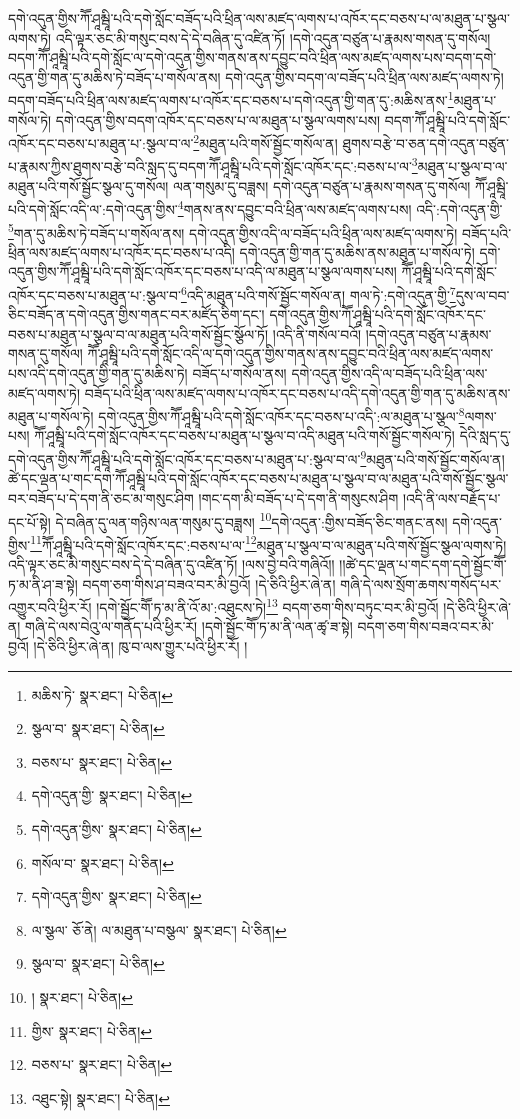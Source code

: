 དགེ་འདུན་གྱིས་ཀཽ་ཤཱམྦཱི་པའི་དགེ་སློང་བཟོད་པའི་ཕྲིན་ལས་མཛད་ལགས་པ་འཁོར་དང་བཅས་པ་ལ་མཐུན་པ་སྩལ་ལགས་ཏེ། འདི་ལྟར་ཅང་མི་གསུང་བས་དེ་དེ་བཞིན་དུ་འཛིན་ཏོ། །དགེ་འདུན་བཙུན་པ་རྣམས་གསན་དུ་གསོལ། བདག་ཀཽ་ཤཱམྦཱི་པའི་དགེ་སློང་ལ་དགེ་འདུན་གྱིས་གནས་ནས་དབྱུང་བའི་ཕྲིན་ལས་མཛད་ལགས་པས་བདག་དགེ་འདུན་གྱི་གན་དུ་མཆིས་ཏེ་བཟོད་པ་གསོལ་ནས། དགེ་འདུན་གྱིས་བདག་ལ་བཟོད་པའི་ཕྲིན་ལས་མཛད་ལགས་ཏེ། བདག་བཟོད་པའི་ཕྲིན་ལས་མཛད་ལགས་པ་འཁོར་དང་བཅས་པ་དགེ་འདུན་གྱི་གན་དུ་:མཆིས་ནས་\footnote{མཆིས་ཏེ་  སྣར་ཐང་།  པེ་ཅིན། }མཐུན་པ་གསོལ་ཏེ། དགེ་འདུན་གྱིས་བདག་འཁོར་དང་བཅས་པ་ལ་མཐུན་པ་སྩལ་ལགས་པས། བདག་ཀཽ་ཤཱམྦཱི་པའི་དགེ་སློང་འཁོར་དང་བཅས་པ་མཐུན་པ་:སྩལ་བ་ལ་\footnote{སྩལ་བ་  སྣར་ཐང་།  པེ་ཅིན། }མཐུན་པའི་གསོ་སྦྱོང་གསོལ་ན། ཐུགས་བརྩེ་བ་ཅན་དགེ་འདུན་བཙུན་པ་རྣམས་ཀྱིས་ཐུགས་བརྩེ་བའི་སླད་དུ་བདག་ཀཽ་ཤཱམྦཱི་པའི་དགེ་སློང་འཁོར་དང་:བཅས་པ་ལ་\footnote{བཅས་པ་  སྣར་ཐང་།  པེ་ཅིན། }མཐུན་པ་སྩལ་བ་ལ་མཐུན་པའི་གསོ་སྦྱོང་སྩལ་དུ་གསོལ། ལན་གསུམ་དུ་བཟླས། དགེ་འདུན་བཙུན་པ་རྣམས་གསན་དུ་གསོལ། ཀཽ་ཤཱམྦཱི་པའི་དགེ་སློང་འདི་ལ་:དགེ་འདུན་གྱིས་\footnote{དགེ་འདུན་གྱི་  སྣར་ཐང་།  པེ་ཅིན། }གནས་ནས་དབྱུང་བའི་ཕྲིན་ལས་མཛད་ལགས་པས། འདི་:དགེ་འདུན་གྱི་\footnote{དགེ་འདུན་གྱིས་  སྣར་ཐང་།  པེ་ཅིན། }གན་དུ་མཆིས་ཏེ་བཟོད་པ་གསོལ་ནས། དགེ་འདུན་གྱིས་འདི་ལ་བཟོད་པའི་ཕྲིན་ལས་མཛད་ལགས་ཏེ། བཟོད་པའི་ཕྲིན་ལས་མཛད་ལགས་པ་འཁོར་དང་བཅས་པ་འདི། དགེ་འདུན་གྱི་གན་དུ་མཆིས་ནས་མཐུན་པ་གསོལ་ཏེ། དགེ་འདུན་གྱིས་ཀཽ་ཤཱམྦཱི་པའི་དགེ་སློང་འཁོར་དང་བཅས་པ་འདི་ལ་མཐུན་པ་སྩལ་ལགས་པས། ཀཽ་ཤཱམྦཱི་པའི་དགེ་སློང་འཁོར་དང་བཅས་པ་མཐུན་པ་:སྩལ་བ་\footnote{གསོལ་བ་  སྣར་ཐང་།  པེ་ཅིན། }འདི་མཐུན་པའི་གསོ་སྦྱོང་གསོལ་ན། གལ་ཏེ་:དགེ་འདུན་གྱི་\footnote{དགེ་འདུན་གྱིས་  སྣར་ཐང་།  པེ་ཅིན། }དུས་ལ་བབ་ཅིང་བཟོད་ན་དགེ་འདུན་གྱིས་གནང་བར་མཛོད་ཅིག་དང་། དགེ་འདུན་གྱིས་ཀཽ་ཤཱམྦཱི་པའི་དགེ་སློང་འཁོར་དང་བཅས་པ་མཐུན་པ་སྩལ་བ་ལ་མཐུན་པའི་གསོ་སྦྱོང་སྩོལ་ཏོ། །འདི་ནི་གསོལ་བའོ། །དགེ་འདུན་བཙུན་པ་རྣམས་གསན་དུ་གསོལ། ཀཽ་ཤཱམྦཱི་པའི་དགེ་སློང་འདི་ལ་དགེ་འདུན་གྱིས་གནས་ནས་དབྱུང་བའི་ཕྲིན་ལས་མཛད་ལགས་པས་འདི་དགེ་འདུན་གྱི་གན་དུ་མཆིས་ཏེ། བཟོད་པ་གསོལ་ནས། དགེ་འདུན་གྱིས་འདི་ལ་བཟོད་པའི་ཕྲིན་ལས་མཛད་ལགས་ཏེ། བཟོད་པའི་ཕྲིན་ལས་མཛད་ལགས་པ་འཁོར་དང་བཅས་པ་འདི་དགེ་འདུན་གྱི་གན་དུ་མཆིས་ནས་མཐུན་པ་གསོལ་ཏེ། དགེ་འདུན་གྱིས་ཀཽ་ཤཱམྦཱི་པའི་དགེ་སློང་འཁོར་དང་བཅས་པ་འདི་:ལ་མཐུན་པ་སྩལ་\footnote{ལ་སྩལ་  ཅོ་ནེ། ལ་མཐུན་པ་བསྩལ་  སྣར་ཐང་།  པེ་ཅིན། }ལགས་པས། ཀཽ་ཤཱམྦཱི་པའི་དགེ་སློང་འཁོར་དང་བཅས་པ་མཐུན་པ་སྩལ་བ་འདི་མཐུན་པའི་གསོ་སྦྱོང་གསོལ་ཏེ། དེའི་སླད་དུ་དགེ་འདུན་གྱིས་ཀཽ་ཤཱམྦཱི་པའི་དགེ་སློང་འཁོར་དང་བཅས་པ་མཐུན་པ་:སྩལ་བ་ལ་\footnote{སྩལ་བ་  སྣར་ཐང་།  པེ་ཅིན། }མཐུན་པའི་གསོ་སྦྱོང་གསོལ་ན། ཚེ་དང་ལྡན་པ་གང་དག་ཀཽ་ཤཱམྦཱི་པའི་དགེ་སློང་འཁོར་དང་བཅས་པ་མཐུན་པ་སྩལ་བ་ལ་མཐུན་པའི་གསོ་སྦྱོང་སྩལ་བར་བཟོད་པ་དེ་དག་ནི་ཅང་མ་གསུང་ཤིག །གང་དག་མི་བཟོད་པ་དེ་དག་ནི་གསུངས་ཤིག །འདི་ནི་ལས་བརྗོད་པ་དང་པོ་སྟེ། དེ་བཞིན་དུ་ལན་གཉིས་ལན་གསུམ་དུ་བཟླས། \footnote{།    སྣར་ཐང་།  པེ་ཅིན། }དགེ་འདུན་:གྱིས་བཟོད་ཅིང་གནང་ནས། དགེ་འདུན་གྱིས་\footnote{གྱིས་  སྣར་ཐང་།  པེ་ཅིན། }ཀཽ་ཤཱམྦཱི་པའི་དགེ་སློང་འཁོར་དང་:བཅས་པ་ལ་\footnote{བཅས་པ་  སྣར་ཐང་།  པེ་ཅིན། }མཐུན་པ་སྩལ་བ་ལ་མཐུན་པའི་གསོ་སྦྱོང་སྩལ་ལགས་ཏེ། འདི་ལྟར་ཅང་མི་གསུང་བས་དེ་དེ་བཞིན་དུ་འཛིན་ཏོ། །ལས་བྱེ་བའི་གཞིའོ།། །།ཚེ་དང་ལྡན་པ་གང་དག་དགེ་སྦྱོང་གཽ་ཏ་མ་ནི་ཤ་ཟ་སྟེ། བདག་ཅག་གིས་ཤ་བཟའ་བར་མི་བྱའོ། །དེ་ཅིའི་ཕྱིར་ཞེ་ན། གཞི་དེ་ལས་སྲོག་ཆགས་གསོད་པར་འགྱུར་བའི་ཕྱིར་རོ། །དགེ་སྦྱོང་གཽ་ཏ་མ་ནི་འོ་མ་:འཐུངས་ཏེ།\footnote{འཐུང་སྟེ།  སྣར་ཐང་།  པེ་ཅིན། } བདག་ཅག་གིས་བཏུང་བར་མི་བྱའོ། །དེ་ཅིའི་ཕྱིར་ཞེ་ན། གཞི་དེ་ལས་བེའུ་ལ་གནོད་པའི་ཕྱིར་རོ། །དགེ་སྦྱོང་གཽ་ཏ་མ་ནི་ལན་ཚྭ་ཟ་སྟེ། བདག་ཅག་གིས་བཟའ་བར་མི་བྱའོ། །དེ་ཅིའི་ཕྱིར་ཞེ་ན། ཁུ་བ་ལས་གྱུར་པའི་ཕྱིར་རོ། །
